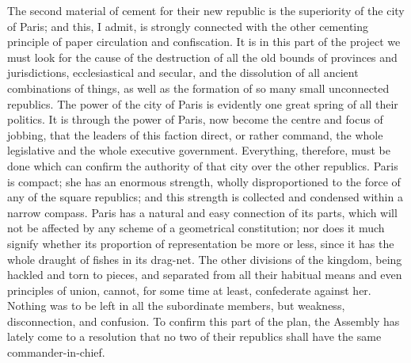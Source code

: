 The second material of cement for their new republic is the superiority of the city of Paris; and this, I admit, is strongly connected with the other cementing principle of paper circulation and confiscation. It is in this part of the project we must look for the cause of the destruction of all the old bounds of provinces and jurisdictions, ecclesiastical and secular, and the dissolution of all ancient combinations of things, as well as the formation of so many small unconnected republics. The power of the city of Paris is evidently one great spring of all their politics. It is through the power of Paris, now become the centre and focus of jobbing, that the leaders of this faction direct, or rather command, the whole legislative and the whole executive government. Everything, therefore, must be done which can confirm the authority of that city over the other republics. Paris is compact; she has an enormous strength, wholly disproportioned to the force of any of the square republics; and this strength is collected and condensed within a narrow compass. Paris has a natural and easy connection of its parts, which will not be affected by any scheme of a geometrical constitution; nor does it much signify whether its proportion of representation be more or less, since it has the whole draught of fishes in its drag-net. The other divisions of the kingdom, being hackled and torn to pieces, and separated from all their habitual means and even principles of union, cannot, for some time at least, confederate against her. Nothing was to be left in all the subordinate members, but weakness, disconnection, and confusion. To confirm this part of the plan, the Assembly has lately come to a resolution that no two of their republics shall have the same commander-in-chief.

